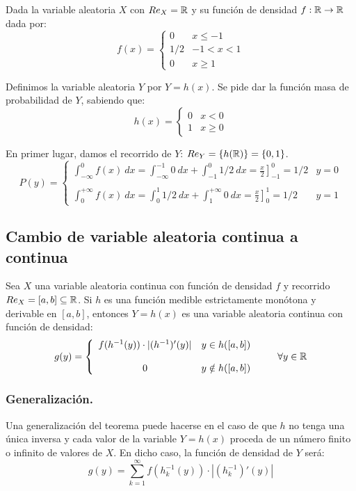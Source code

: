 \begin{ejemplo}
    Dada la variable aleatoria $X$ con $Re_X=\mathbb R$ y su función de densidad $f:\mathbb R \rightarrow \mathbb R$ dada por:
    $$f(x) = \left\{ \begin{array}{ll}
        0   & x \leq -1  \\
        1/2 & -1 < x < 1 \\
        0   & x \geq 1
    \end{array} \right.$$
    
    
    Definimos la variable aleatoria $Y$ por $Y=h(x)$. Se pide dar la función masa de probabilidad de $Y$, sabiendo que:
    $$h(x) = \left\{ \begin{array}{ll}
        0 & x < 0    \\
        1 & x \geq 0
    \end{array} \right.$$
    
    En primer lugar, damos el recorrido de $Y$: $Re_Y = \{h(\mathbb R)\} = \{0,1\}$.
    $$P(y) = \left\{ \begin{array}{ll}
        \displaystyle \int_{-\infty}^0 f(x)~dx = \int_{-\infty}^{-1} 0~dx + \int_{-1}^0 1/2~dx = \left.\frac{x}{2}\right]_{-1}^0 = 1/2 & y=0   \\ \\
        \displaystyle \int_0^{+\infty} f(x)~dx = \int_0^1 1/2~dx + \int_1^{+\infty} 0~dx = \left.\frac{x}{2}\right]_0^1 = 1/2          & y = 1
      \end{array} \right.$$
\end{ejemplo}

\subsection{Cambio de variable aleatoria continua a continua}
\label{subsec:CV_Continua}

Sea $X$ una variable aleatoria continua con función de densidad $f$ y recorrido $Re_X=[a,b]\subseteq \mathbb R$. Si $h$
es una función medible estrictamente monótona y derivable en $[a,b]$, entonces $Y=h(x)$ es una variable
aleatoria continua con función de densidad:
$$g(y) = \left\{ \begin{array}{cc}
    f(h^{-1}(y)) \cdot |(h^{-1})'(y)| & y \in h([a,b])    \\ \\
    0                                 & y \notin h([a,b])
  \end{array} \right. \qquad \forall y \in \mathbb R$$

\subsubsection{Generalización.}
Una generalización del teorema puede hacerse en el caso de que $h$ no tenga una única inversa y cada valor de la variable $Y=h(x)$ proceda de un número finito o infinito de valores de $X$. En dicho caso, la función de densidad de $Y$ será:
$$g(y) = \sum_{k=1}^{\infty} f(h^{-1}_k(y)) \cdot |(h^{-1}_k)'(y)|$$

